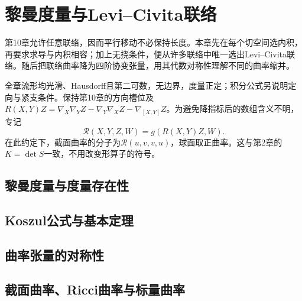 \chapter{黎曼度量与Levi--Civita联络}
\label{ch:11-riemannian}

第10章允许任意联络，因而平行移动不必保持长度。本章先在每个切空间选内积，再要求求导与内积相容；加上无挠条件，便从许多联络中唯一选出Levi--Civita联络。随后把联络曲率降为四阶协变张量，用其代数对称性理解不同的曲率缩并。

全章流形均光滑、Hausdorff且第二可数，无边界，度量正定；积分公式另说明定向与紧支条件。保持第10章的方向槽位及$R(X,Y)Z=\nabla_X\nabla_YZ-\nabla_Y\nabla_XZ-\nabla_{[X,Y]}Z$。为避免降指标后的数组含义不明，专记
\[
 \mathcal R(X,Y,Z,W)=g(R(X,Y)Z,W).
\]
在此约定下，截面曲率的分子为$\mathcal R(u,v,v,u)$，球面取正曲率。这与第2章的$K=\det S$一致，不用改变形算子的符号。

\section{黎曼度量与度量存在性}


\section{Koszul公式与基本定理}


\section{曲率张量的对称性}


\section{截面曲率、Ricci曲率与标量曲率}



